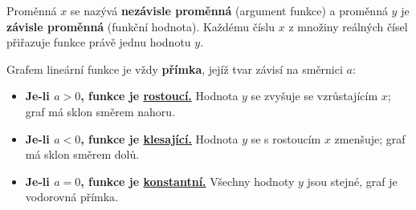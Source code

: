 \documentclass[12pt,a4paper]{article}
\begin{document}
Proměnná \(x\) se nazývá \textbf{nezávisle proměnná} (argument funkce)  
a proměnná \(y\) je \textbf{závisle proměnná} (funkční hodnota).  
Každému číslu \(x\) z množiny reálných čísel přiřazuje funkce právě jednu hodnotu \(y\).  


Grafem lineární funkce je vždy \textbf{přímka}, jejíž tvar závisí na směrnici \(a\):

\begin{itemize}
    \item \textbf{Je-li \(a>0\), funkce je \hyperlink{rostouci}{rostoucí.}}  
    Hodnota \(y\) se zvyšuje se vzrůstajícím \(x\); graf má sklon směrem nahoru.

    \item \textbf{Je-li \(a<0\), funkce je \hyperlink{klesajici}{klesající.}}  
    Hodnota \(y\) se s rostoucím \(x\) zmenšuje; graf má sklon směrem dolů.

    \item \textbf{Je-li \(a=0\), funkce je \hyperlink{konstantni}{konstantní.}}  
    Všechny hodnoty \(y\) jsou stejné, graf je vodorovná přímka.
\end{itemize}
\end{document}
